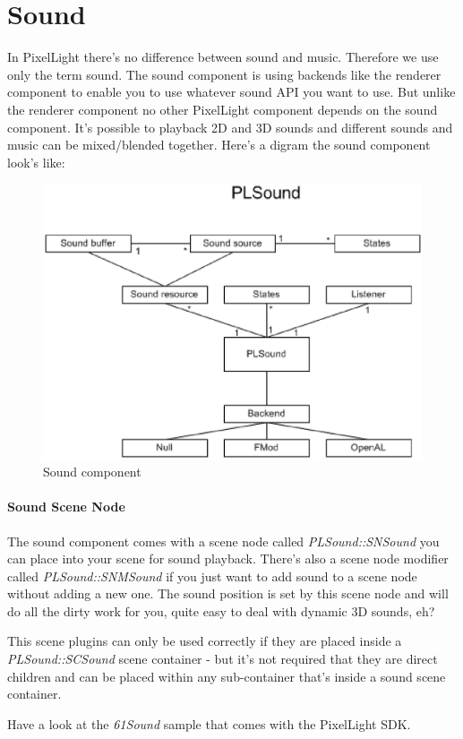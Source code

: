 \section{Sound}
In PixelLight there's no difference between sound and music. Therefore we use only the term sound. The sound component is using backends like the renderer component to enable you to use whatever sound \ac{API} you want to use. But unlike the renderer component no other PixelLight component depends on the sound component. It's possible to playback 2D and 3D sounds and different sounds and music can be mixed/blended together. Here's a digram the sound component look's like:\\
\begin{figure}
  \begin{center}
    \includegraphics{pics/PLSoundClassDiagram.eps}
  \end{center}
  \caption{Sound component}
  \label{fig:Sound component high-level UML class diagram}
\end{figure}


\paragraph{Sound Scene Node}
The sound component comes with a scene node called \emph{PLSound::SNSound} you can place into your scene for sound playback. There's also a scene node modifier called \emph{PLSound::SNMSound} if you just want to add sound to a scene node without adding a new one. The sound position is set by this scene node and will do all the dirty work for you, quite easy to deal with dynamic 3D sounds, eh?

This scene plugins can only be used correctly if they are placed inside a \emph{PLSound::SCSound} scene container - but it's not required that they are direct children and can be placed within any sub-container that's inside a sound scene container.

Have a look at the \emph{61Sound} sample that comes with the PixelLight \ac{SDK}.
